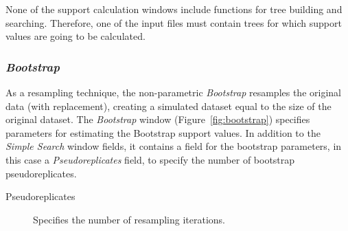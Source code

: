 {None of the support calculation windows include functions for tree
building and searching. Therefore, one of the input files must
contain trees for which support values are going to be calculated.

\subsubsection*{\emph{Bootstrap}}

As a resampling technique, the non-parametric \emph{Bootstrap}
resamples the original data (with replacement), creating a simulated
dataset equal to the size of the original dataset. The \emph{Bootstrap}
window (Figure~\ref{fig:bootstrap}) specifies parameters for
estimating the Bootstrap support values. In addition to the
\emph{Simple Search} window fields, it contains a field for the
bootstrap parameters, in this case a \emph{Pseudoreplicates} field,
to specify the number of bootstrap pseudoreplicates.

\begin{description}
\item[Pseudoreplicates] Specifies the number of resampling iterations.
\end{description}

}
